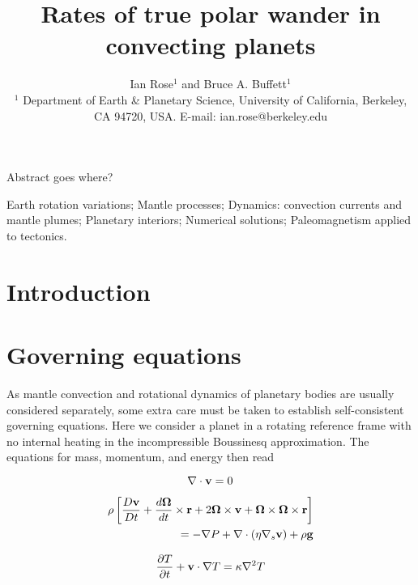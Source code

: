 \documentclass{gji}
\title[TPW Rates]
  {Rates of true polar wander in convecting planets}
\author[I. Rose and B. Buffett]
  {Ian Rose$^1$ and Bruce A. Buffett$^1$ \\
  $^1$ Department of Earth \& Planetary Science, University of California, Berkeley, CA 94720, USA.  E-mail: ian.rose@berkeley.edu
  }
\date{}
\begin{document}
\label{firstpage}

\maketitle

\begin{summary}
Abstract goes where?
\end{summary}

\begin{keywords}
Earth rotation variations; Mantle processes; Dynamics: convection currents and mantle plumes; Planetary interiors; Numerical solutions; Paleomagnetism applied to tectonics.
\end{keywords}

\section{Introduction}


\section{Governing equations}

As mantle convection and rotational dynamics of planetary bodies are usually considered separately, some extra care must be taken to establish self-consistent governing equations.  
Here we consider a planet in a rotating reference frame with no internal heating in the incompressible Boussinesq approximation.  The equations for mass, momentum, and energy then read

\begin{equation}
\nabla \cdot {\bf v} = 0
\label{conserve_mass}
\end{equation}

\begin{equation}
\begin{aligned}
 \rho \left[ \frac{D \bf v}{D t} + \frac{d \bf \Omega}{dt} \times {\bf r} +  2 {\bf \Omega} \times {\bf v} + {\bf \Omega \times \Omega \times r} \right] \\ = - \nabla P + \nabla \cdot \left( \eta \nabla_s {\bf v} \right) + \rho {\bf g}
\label{navier_stokes}
\end{aligned}
\end{equation}

\begin{equation}
\frac{\partial T}{\partial t} + {\bf v} \cdot \nabla T = \kappa \nabla^2 T
\label{energy}
\end{equation}
\end{document}
